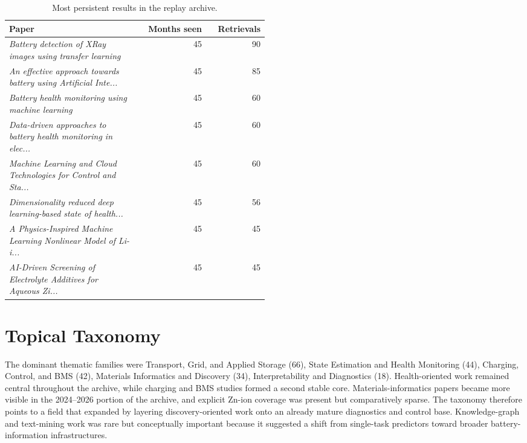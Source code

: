 \documentclass[journal]{IEEEtran}
\begin{document}
\begin{table}[t]
\caption{Most persistent results in the replay archive.}
\label{tab:visibility}
\centering
\footnotesize
\begin{tabularx}{\linewidth}{p{0.5\linewidth} rr}
\toprule
Paper & Months seen & Retrievals \\
\midrule
\textit{Battery detection of XRay images using transfer learning} & 45 & 90 \\
\textit{An effective approach towards battery using Artificial Inte...} & 45 & 85 \\
\textit{Battery health monitoring using machine learning} & 45 & 60 \\
\textit{Data-driven approaches to battery health monitoring in elec...} & 45 & 60 \\
\textit{Machine Learning and Cloud Technologies for Control and Sta...} & 45 & 60 \\
\textit{Dimensionality reduced deep learning-based state of health...} & 45 & 56 \\
\textit{A Physics-Inspired Machine Learning Nonlinear Model of Li-i...} & 45 & 45 \\
\textit{AI-Driven Screening of Electrolyte Additives for Aqueous Zi...} & 45 & 45 \\
\bottomrule
\end{tabularx}
\end{table}

\section{Topical Taxonomy}
The dominant thematic families were Transport, Grid, and Applied Storage (66), State Estimation and Health Monitoring (44), Charging, Control, and BMS (42), Materials Informatics and Discovery (34), Interpretability and Diagnostics (18). Health-oriented work \cite{stateestimationof2023,onlineconditionmonitorin2022,socestimationof2023,participationofbattery2020} remained central throughout the archive, while charging and BMS studies \cite{stateestimationof2023,onlineconditionmonitorin2022,socestimationof2023,participationofbattery2020} formed a second stable core. Materials-informatics papers \cite{textminingfor2022,recentadvancesin2025,interpretablemachinelear2025,datadrivenapproaches2024} became more visible in the 2024--2026 portion of the archive, and explicit Zn-ion coverage \cite{recentadvancesin2025,predictivedesignof2024,electrolytesforaqueous2025} was present but comparatively sparse. The taxonomy therefore points to a field that expanded by layering discovery-oriented work onto an already mature diagnostics and control base. Knowledge-graph and text-mining work \cite{textminingfor2022,acceleratingfunctionalma2013} was rare but conceptually important because it suggested a shift from single-task predictors toward broader battery-information infrastructures.
\end{document}
